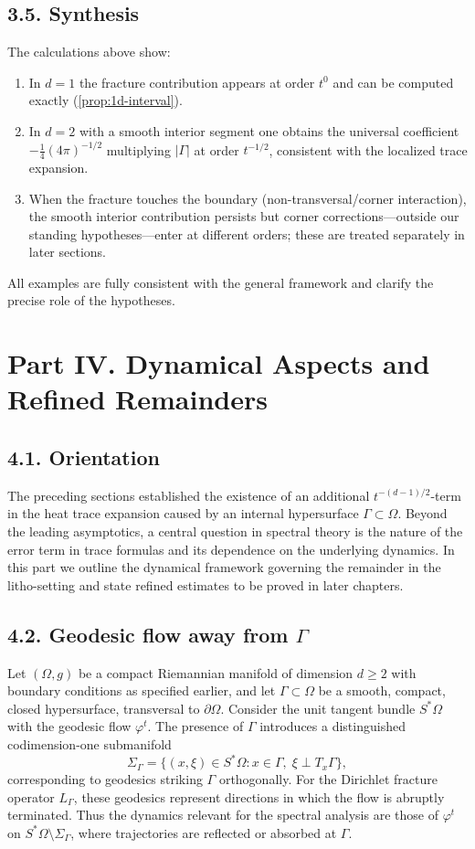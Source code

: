 \subsection*{3.5. Synthesis}
The calculations above show:
\begin{enumerate}
\item In $d=1$ the fracture contribution appears at order $t^0$ and can be computed exactly (\autoref{prop:1d-interval}).
\item In $d=2$ with a smooth interior segment one obtains the universal coefficient $-\frac14(4\pi)^{-1/2}$ multiplying $|\Gamma|$ at order $t^{-1/2}$, consistent with the localized trace expansion.
\item When the fracture touches the boundary (non-transversal/corner interaction), the smooth interior contribution persists but corner corrections—outside our standing hypotheses—enter at different orders; these are treated separately in later sections.
\end{enumerate}
All examples are fully consistent with the general framework and clarify the precise role of the hypotheses.

\section*{Part IV. Dynamical Aspects and Refined Remainders}

\subsection*{4.1. Orientation}
The preceding sections established the existence of an additional $t^{-(d-1)/2}$-term in the heat trace expansion caused by an internal hypersurface $\Gamma\subset\Omega$. Beyond the leading asymptotics, a central question in spectral theory is the nature of the error term in trace formulas and its dependence on the underlying dynamics. In this part we outline the dynamical framework governing the remainder in the litho-setting and state refined estimates to be proved in later chapters.

\subsection*{4.2. Geodesic flow away from $\Gamma$}
Let $(\Omega,g)$ be a compact Riemannian manifold of dimension $d\ge2$ with boundary conditions as specified earlier, and let $\Gamma\subset\Omega$ be a smooth, compact, closed hypersurface, transversal to $\partial\Omega$. Consider the unit tangent bundle $S^*\Omega$ with the geodesic flow $\varphi^t$. The presence of $\Gamma$ introduces a distinguished codimension-one submanifold
\[
\Sigma_\Gamma = \{ (x,\xi)\in S^*\Omega : x\in\Gamma,\; \xi\perp T_x\Gamma \},
\]
corresponding to geodesics striking $\Gamma$ orthogonally. For the Dirichlet fracture operator $L_\Gamma$, these geodesics represent directions in which the flow is abruptly terminated. Thus the dynamics relevant for the spectral analysis are those of $\varphi^t$ on $S^*\Omega\setminus\Sigma_\Gamma$, where trajectories are reflected or absorbed at $\Gamma$.

